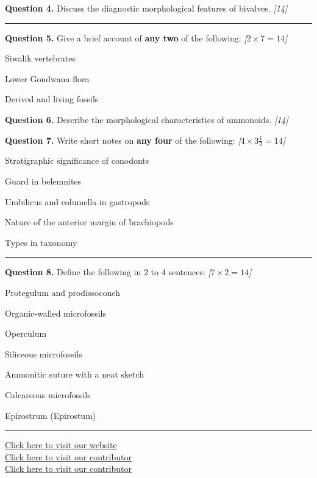 \documentclass[11pt,a4paper]{article}
\newcommand{\pts}[1]{\hfill   \textit{[#1]}}
\begin{document}
\medskip


\noindent   \textbf{Question 4.} Discuss the diagnostic morphological features of bivalves. \pts{14}

\bigskip


\rule{\linewidth}{0.4pt}\smallskip




\noindent   \textbf{Question 5.} Give a brief account of   \textbf{any two} of the following: \pts{$2  \times 7 = 14$}

\begin{parts}
  \item Siwalik vertebrates
  \item Lower Gondwana flora
  \item Derived and living fossils
\end{parts}

\medskip


\noindent   \textbf{Question 6.} Describe the morphological characteristics of ammonoids. \pts{14}

\medskip


\noindent   \textbf{Question 7.} Write short notes on   \textbf{any four} of the following: \pts{$4  \times 3\frac{1}{2} = 14$}

\begin{parts}
  \item Stratigraphic significance of conodonts
  \item Guard in belemnites
  \item Umbilicus and columella in gastropods
  \item Nature of the anterior margin of brachiopods
  \item Types in taxonomy
\end{parts}

\bigskip


\rule{\linewidth}{0.4pt}\smallskip




\noindent   \textbf{Question 8.} Define the following in 2 to 4 sentences: \pts{$7  \times 2 = 14$}

\begin{romanparts}
  \item Protegulum and prodissoconch
  \item Organic-walled microfossils
  \item Operculum
  \item Siliceous microfossils
  \item Ammonitic suture with a neat sketch
  \item Calcareous microfossils
  \item Epirostrum (Epirostum)
\end{romanparts}

\vfill\rule{\linewidth}{0.4pt}

\begin{center}\small
\href{https://bhu-exam.vercel.app/}{Click here to visit our website}\\[4pt]
\href{https://me-aryan.vercel.app/}{Click here to visit our contributor}\\[4pt]
\href{https://quashan-me.vercel.app/}{Click here to visit our contributor}
\end{center}
\end{document}
